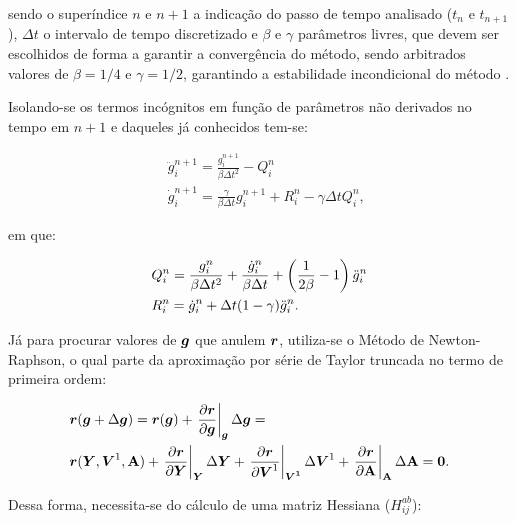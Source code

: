 \noindent sendo o superíndice $n$ e $n+1$ a indicação do passo de tempo analisado ($t_n$ e $t_{n+1}$), $\Delta t$ o intervalo de tempo discretizado e $\beta$ e $\gamma$ parâmetros livres, que devem ser escolhidos de forma a garantir a convergência do método, sendo arbitrados valores de $\beta=1/4$ e $\gamma=1/2$, garantindo a estabilidade incondicional do método \cite{LINDFIELD2019239}.

Isolando-se os termos incógnitos em função de parâmetros não derivados no tempo em $n+1$ e daqueles já conhecidos tem-se:

\begin{subequations}
    \begin{align}
         & \ddot{g}_i^{n+1}=\frac{g_i^{n+1}}{\beta\Delta t^2}-Q_i^n                                \\
         & \dot{g}_i^{n+1}=\frac{\gamma}{\beta\Delta t}g_i^{n+1}+R_i^n-\gamma\Delta tQ_i^n\text{,}
    \end{align}
    \label{eq:CSD-Newmark2}
\end{subequations}

\noindent em que:

\begin{subequations}
    \begin{align}
         & Q_i^n=\frac{g_i^n}{\beta\Delta t^2}+\frac{\dot{g}_i^n}{\beta\Delta t}+\left({\frac{1}{2\beta}-1}\right)\ddot{g}_i^n \\
         & R_i^n=\dot{g}_i^n+\Delta t(1-\gamma)\ddot{g}_i^n\text{.}
    \end{align}
    \label{eq:CSD-QnRn}
\end{subequations}

Já para procurar valores de $\boldsymbol{g}$ que anulem $\boldsymbol{r}$, utiliza-se o Método de Newton-Raphson, o qual parte da aproximação por série de Taylor truncada no termo de primeira ordem:

\begin{equation}
    \begin{split}
        &\boldsymbol{r}(\boldsymbol{g}+\Delta\boldsymbol{g})=\boldsymbol{r}(\boldsymbol{g})+\left.\frac{\partial{\boldsymbol{r}}}{\partial{\boldsymbol{g}}}\right|_{\boldsymbol{\boldsymbol{g}}}\Delta\boldsymbol{g}=\\
        &\boldsymbol{r}(\boldsymbol{Y},\boldsymbol{V}^1,\boldsymbol{\mathrm{A}})+\left.\frac{\partial{\boldsymbol{r}}}{\partial{\boldsymbol{Y}}}\right|_{\boldsymbol{\boldsymbol{Y}}}\Delta\boldsymbol{Y}+\left.\frac{\partial{\boldsymbol{r}}}{\partial{\boldsymbol{V}^1}}\right|_{\boldsymbol{\boldsymbol{V}^1}}\Delta\boldsymbol{V}^1+\left.\frac{\partial{\boldsymbol{r}}}{\partial{\boldsymbol{\mathrm{A}}}}\right|_{\boldsymbol{\boldsymbol{\mathrm{A}}}}\Delta\boldsymbol{\mathrm{A}}=\boldsymbol{0}\text{.}
    \end{split}
\end{equation}

\noindent Dessa forma, necessita-se do cálculo de uma matriz Hessiana ($H_{ij}^{ab}$):

